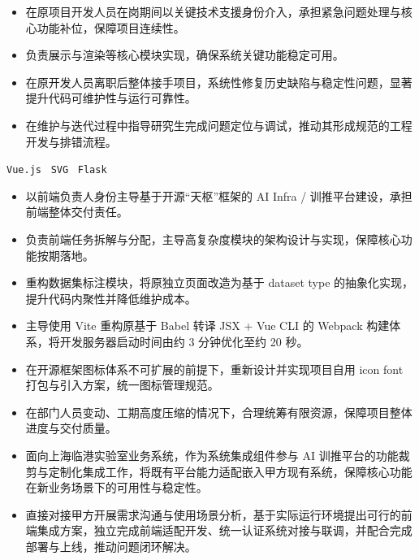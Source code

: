 \documentclass{resume}
\begin{document}


\begin{itemize}
  \item 在原项目开发人员在岗期间以关键技术支援身份介入，承担紧急问题处理与核心功能补位，保障项目连续性。
  \item 负责展示与渲染等核心模块实现，确保系统关键功能稳定可用。
  \item 在原开发人员离职后整体接手项目，系统性修复历史缺陷与稳定性问题，显著提升代码可维护性与运行可靠性。
  \item 在维护与迭代过程中指导研究生完成问题定位与调试，推动其形成规范的工程开发与排错流程。
\end{itemize}

\vspace{0.3em}
\texttt{Vue.js} \textperiodcentered\
\texttt{SVG} \textperiodcentered\
\texttt{Flask}



\begin{itemize}
  \item 以前端负责人身份主导基于开源“天枢”框架的 AI Infra / 训推平台建设，承担前端整体交付责任。
  \item 负责前端任务拆解与分配，主导高复杂度模块的架构设计与实现，保障核心功能按期落地。
  \item 重构数据集标注模块，将原独立页面改造为基于 dataset type 的抽象化实现，提升代码内聚性并降低维护成本。
  \item 主导使用 Vite 重构原基于 Babel 转译 JSX + Vue CLI 的 Webpack 构建体系，将开发服务器启动时间由约 3 分钟优化至约 20 秒。
  \item 在开源框架图标体系不可扩展的前提下，重新设计并实现项目自用 icon font 打包与引入方案，统一图标管理规范。
  \item 在部门人员变动、工期高度压缩的情况下，合理统筹有限资源，保障项目整体进度与交付质量。
  \item 面向上海临港实验室业务系统，作为系统集成组件参与 AI 训推平台的功能裁剪与定制化集成工作，将既有平台能力适配嵌入甲方现有系统，保障核心功能在新业务场景下的可用性与稳定性。
  \item 直接对接甲方开展需求沟通与使用场景分析，基于实际运行环境提出可行的前端集成方案，独立完成前端适配开发、统一认证系统对接与联调，并配合完成部署与上线，推动问题闭环解决。

\end{itemize}
\end{document}
